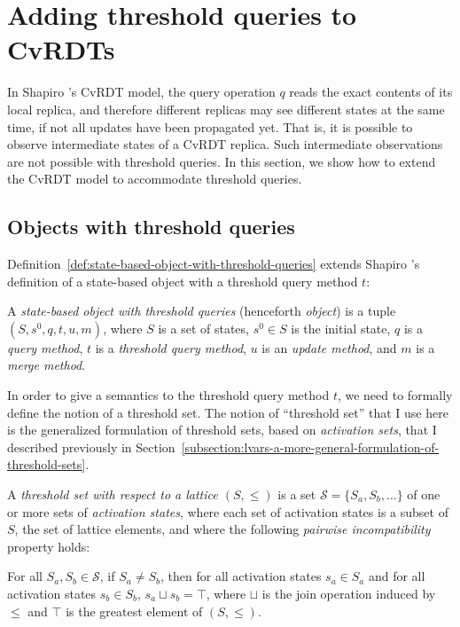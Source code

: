 \section{Adding threshold queries to CvRDTs}\label{s:distributed-model}

In Shapiro \etal's CvRDT model, the query operation $q$ reads the
exact contents of its local replica, and therefore different replicas
may see different states at the same time, if not all updates have
been propagated yet.  That is, it is possible to observe intermediate
states of a CvRDT replica.  Such intermediate observations are not
possible with threshold queries. In this section, we show how to
extend the CvRDT model to accommodate threshold queries.

\subsection{Objects with threshold queries}

Definition~\ref{def:state-based-object-with-threshold-queries}
extends Shapiro \etal's definition of a state-based object with
a threshold query method $t$:
\begin{definition}
  \label{def:state-based-object-with-threshold-queries}
  A \emph{state-based object with threshold queries} (henceforth
  \emph{object}) is a tuple $(S, s^0, q, t, u, m)$, where $S$ is a set
  of states, $s^0 \in S$ is the initial state, $q$ is a \emph{query
    method}, $t$ is a \emph{threshold query
    method}, $u$ is an \emph{update method}, and $m$ is a \emph{merge
    method}.
\end{definition}

In order to give a semantics to the threshold query method $t$, we
need to formally define the notion of a threshold set.  The notion of
``threshold set'' that I use here is the generalized formulation of
threshold sets, based on \emph{activation sets}, that I described
previously in
Section~\ref{subsection:lvars-a-more-general-formulation-of-threshold-sets}.

\begin{definition}
  \label{def:threshold-set}
  A \emph{threshold set with respect to a lattice $(S, \leq)$} is a
  set $\mathcal{S} = \{ S_a, S_b, \dots \}$ of one or more sets of
  \emph{activation states}, where each set of activation states is a
  subset of $S$, the set of lattice elements, and where the following
  \emph{pairwise incompatibility} property holds:

  For all $S_a, S_b \in \mathcal{S}$, if $S_a \neq S_b$, then for all
  activation states $s_a \in S_a$ and for all activation states $s_b \in
  S_b$, $s_a \sqcup s_b = \top$, where $\sqcup$ is the join operation
  induced by $\leq$ and $\top$ is the greatest element of $(S, \leq)$.
\end{definition}

